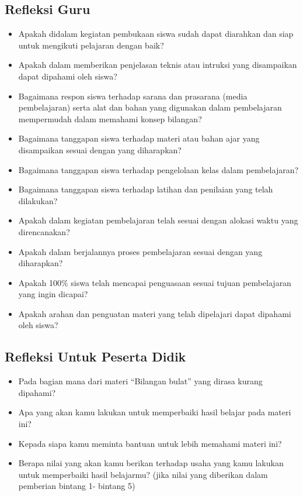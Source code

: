 \documentclass[a5paper,10pt,openany]{book}
\begin{document}
\subsection*{Refleksi Guru}
{\color{NavyBlue}
	\begin{itemize}[\faQuestionCircle,leftmargin=*,itemsep=-4pt,topsep=2pt]	
	\item Apakah didalam kegiatan pembukaan siswa sudah dapat diarahkan dan siap untuk mengikuti pelajaran dengan baik?
	\item Apakah dalam memberikan penjelasan teknis atau intruksi yang disampaikan dapat dipahami oleh siswa?
	\item Bagaimana respon siswa terhadap sarana dan prasarana (media pembelajaran) serta alat dan bahan yang digunakan dalam pembelajaran mempermudah dalam memahami konsep bilangan?
	\item Bagaimana tanggapan siswa terhadap materi atau bahan ajar yang disampaikan sesuai dengan yang diharapkan?
	\item Bagaimana tanggapan siswa terhadap pengelolaan kelas dalam pembelajaran?
	\item Bagaimana tanggapan siswa terhadap latihan dan penilaian yang telah dilakukan?
	\item Apakah dalam kegiatan pembelajaran telah sesuai dengan alokasi waktu yang direncanakan?
	\item Apakah dalam berjalannya proses pembelajaran sesuai dengan yang diharapkan?
	\item Apakah 100\% siswa telah mencapai penguasaan sesuai tujuan pembelajaran yang ingin dicapai?
	\item Apakah arahan dan penguatan materi yang telah dipelajari dapat dipahami oleh siswa?	
	\end{itemize}
}
\subsection*{Refleksi Untuk Peserta Didik}
{\color{NavyBlue}
	\begin{itemize}[\faQuestionCircle,leftmargin=*,itemsep=-4pt,topsep=2pt]	
		\item Pada bagian mana dari materi “Bilangan bulat” yang dirasa kurang dipahami?
		\item Apa yang akan kamu lakukan untuk memperbaiki hasil belajar pada materi ini?
		\item Kepada siapa kamu meminta bantuan untuk lebih memahami materi ini?
		\item Berapa nilai yang akan kamu berikan terhadap usaha yang kamu lakukan untuk memperbaiki hasil belajarmu? (jika nilai yang diberikan dalam pemberian bintang 1- bintang 5)
	\end{itemize}
}
\newpage
\end{document}
